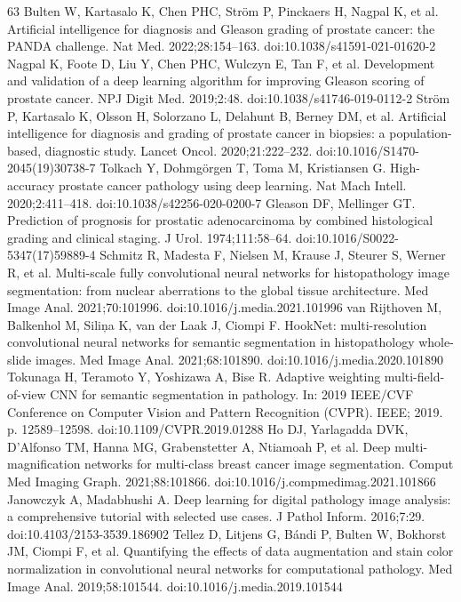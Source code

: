 \documentclass[10pt,letterpaper]{article}
\begin{document}
\begin{thebibliography}{63}
 Bulten W, Kartasalo K, Chen PHC, Str\"om P, Pinckaers H, Nagpal K, et al. Artificial intelligence for diagnosis and Gleason grading of prostate cancer: the PANDA challenge. Nat Med. 2022;28:154--163. doi:10.1038/s41591-021-01620-2
 Nagpal K, Foote D, Liu Y, Chen PHC, Wulczyn E, Tan F, et al. Development and validation of a deep learning algorithm for improving Gleason scoring of prostate cancer. NPJ Digit Med. 2019;2:48. doi:10.1038/s41746-019-0112-2
 Str\"om P, Kartasalo K, Olsson H, Solorzano L, Delahunt B, Berney DM, et al. Artificial intelligence for diagnosis and grading of prostate cancer in biopsies: a population-based, diagnostic study. Lancet Oncol. 2020;21:222--232. doi:10.1016/S1470-2045(19)30738-7
 Tolkach Y, Dohmg\"orgen T, Toma M, Kristiansen G. High-accuracy prostate cancer pathology using deep learning. Nat Mach Intell. 2020;2:411--418. doi:10.1038/s42256-020-0200-7
 Gleason DF, Mellinger GT. Prediction of prognosis for prostatic adenocarcinoma by combined histological grading and clinical staging. J Urol. 1974;111:58--64. doi:10.1016/S0022-5347(17)59889-4
 Schmitz R, Madesta F, Nielsen M, Krause J, Steurer S, Werner R, et al. Multi-scale fully convolutional neural networks for histopathology image segmentation: from nuclear aberrations to the global tissue architecture. Med Image Anal. 2021;70:101996. doi:10.1016/j.media.2021.101996
 van Rijthoven M, Balkenhol M, Sili\c{n}a K, van der Laak J, Ciompi F. HookNet: multi-resolution convolutional neural networks for semantic segmentation in histopathology whole-slide images. Med Image Anal. 2021;68:101890. doi:10.1016/j.media.2020.101890
 Tokunaga H, Teramoto Y, Yoshizawa A, Bise R. Adaptive weighting multi-field-of-view CNN for semantic segmentation in pathology. In: 2019 IEEE/CVF Conference on Computer Vision and Pattern Recognition (CVPR). IEEE; 2019. p. 12589--12598. doi:10.1109/CVPR.2019.01288
 Ho DJ, Yarlagadda DVK, D'Alfonso TM, Hanna MG, Grabenstetter A, Ntiamoah P, et al. Deep multi-magnification networks for multi-class breast cancer image segmentation. Comput Med Imaging Graph. 2021;88:101866. doi:10.1016/j.compmedimag.2021.101866
 Janowczyk A, Madabhushi A. Deep learning for digital pathology image analysis: a comprehensive tutorial with selected use cases. J Pathol Inform. 2016;7:29. doi:10.4103/2153-3539.186902
 Tellez D, Litjens G, B\'andi P, Bulten W, Bokhorst JM, Ciompi F, et al. Quantifying the effects of data augmentation and stain color normalization in convolutional neural networks for computational pathology. Med Image Anal. 2019;58:101544. doi:10.1016/j.media.2019.101544

\end{thebibliography}
\end{document}
